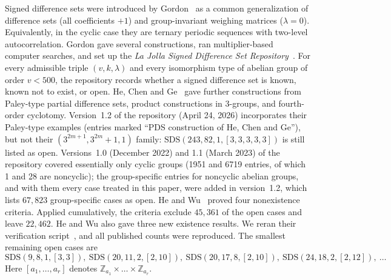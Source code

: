 \documentclass[11pt]{article}
\numberwithin{equation}{section}
\theoremstyle{definition}
\theoremstyle{remark}
\newcommand{\Z}{\mathbb Z}
\newcommand{\sds}[4]{\mathrm{SDS}(#1,#2,#3,[#4])}
\begin{document}
Signed difference sets were introduced by Gordon~\cite{Gordon2023} as a common generalization of
difference sets (all coefficients $+1$) and group-invariant weighing matrices ($\lambda=0$).
Equivalently, in the cyclic case they are ternary periodic sequences with two-level autocorrelation.
Gordon gave several constructions, ran multiplier-based computer searches, and set up the
\emph{La Jolla Signed Difference Set Repository}~\cite{GordonSDSrepo}. For every admissible
triple $(v,k,\lambda)$ and every isomorphism type of abelian group of order $v<500$, the repository
records whether a signed difference set is known, known not to exist, or open. He, Chen and
Ge~\cite{HeChenGe2024} gave further constructions from Paley-type partial difference sets,
product constructions in $3$-groups, and fourth-order cyclotomy. Version~1.2 of the repository
(April 24, 2026) incorporates their Paley-type examples (entries marked ``PDS construction of He,
Chen and Ge''), but not their $(3^{2m+1},3^{2m}+1,1)$ family: $\sds{243}{82}{1}{3,3,3,3,3}$ is
still listed as open. Versions~1.0 (December 2022) and 1.1 (March 2023) of the repository covered
essentially only cyclic groups (1951 and 6719 entries, of which 1 and 28 are noncyclic); the
group-specific entries for noncyclic abelian groups, and with them every case treated in this
paper, were added in version~1.2, which lists $67{,}823$ group-specific cases as open. He and Wu~\cite{HeWu2026} proved four nonexistence criteria. Applied cumulatively, the
criteria exclude $45{,}361$ of the open cases and leave $22{,}462$. He and Wu also gave three new
existence results. We reran their verification script~\cite{HeScript}, and all published counts
were reproduced. The smallest remaining open cases are
\[
 \sds{9}{8}{1}{3,3},\ \sds{20}{11}{2}{2,10},\ \sds{20}{17}{8}{2,10},\ \sds{24}{18}{2}{2,12},\ \dots
\]
Here $[a_1,\dots,a_r]$ denotes $\Z_{a_1}\times\dots\times\Z_{a_r}$.
\end{document}

